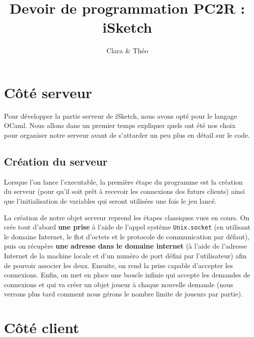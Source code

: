 \documentclass[a4paper, 11pt]{article}
\title{Devoir de programmation PC2R : iSketch}
\author{Clara \bsc{Muller} \& Théo \bsc{Lebourg}}
\date{}
\begin{document}
\maketitle

\section{Côté serveur}
Pour développer la partie serveur de iSketch, nous avons opté pour le
langage OCaml. Nous allons dans un premier temps expliquer quels ont
été nos choix pour organiser notre serveur avant de s’attarder un peu
plus en détail sur le code.

\subsection {Création du serveur}
Lorsque l'on lance l’executable, la première étape du programme est la
création du serveur (pour qu’il soit prêt à recevoir les connexions
des futurs clients) ainsi que l’initialisation de variables qui seront
utilisées une fois le jeu lancé.

\bigskip La création de notre objet serveur reprend les étapes
classiques vues en cours. On crée tout d’abord \textbf{une prise} à
l’aide de l’appel système \verb+Unix.socket+ (en utilisant le domaine
Internet, le flot d’octets et le protocole de communication par
défaut), puis on récupère \textbf{une adresse dans le domaine
  internet} (à l’aide de l’adresse Internet de la machine locale et
d’un numéro de port défini par l’utilisateur) afin de pouvoir associer
les deux. Ensuite, on rend la prise capable d’accepter les
connexions. Enfin, on met en place une boucle infinie qui accepte les
demandes de connexions et qui va créer un objet joueur à chaque
nouvelle demande (nous verrons plus tard comment nous gérons le nombre
limite de joueurs par partie).

\bigskip 


\section{Côté client}
\end{document}

